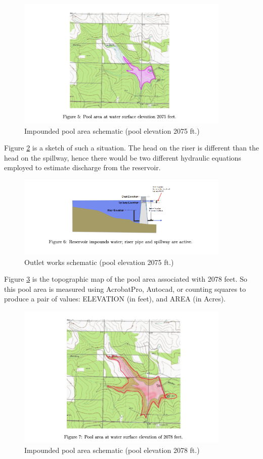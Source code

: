 \documentclass[12pt]{article}
\begin{document}
\begin{figure}[h!] %
   \centering
   \includegraphics[width=4.0in]{fig5.png} 
   \caption{Impounded pool area schematic (pool elevation 2075 ft.)}
   \label{fig:fig5}
\end{figure}

Figure \ref{fig:fig6} is a sketch of such a situation. The head on the riser is different than the head on the spillway, hence there would be two different hydraulic equations employed to estimate discharge from the reservoir.

\begin{figure}[h!] %
   \centering
   \includegraphics[width=4.0in]{fig6.png} 
   \caption{Outlet works schematic (pool elevation 2075 ft.)}
   \label{fig:fig6}
\end{figure}

Figure \ref{fig:fig7} is the topographic map of the pool area associated with 2078 feet. So this pool area is measured using AcrobatPro, Autocad, or counting squares to produce a pair of values: ELEVATION (in feet), and AREA (in Acres).

\begin{figure}[h!] %
   \centering
   \includegraphics[width=4.0in]{fig7.png} 
   \caption{Impounded pool area schematic (pool elevation 2078 ft.)}
   \label{fig:fig7}
\end{figure}
\end{document}

